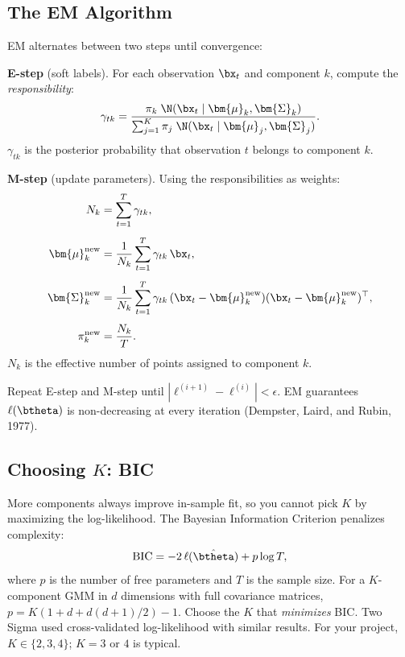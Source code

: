 \subsection{The EM Algorithm}
\label{sec:regimes:em}

EM alternates between two steps until convergence:

\begin{keyidea}
\textbf{E-step} (soft labels).  For each observation $\bx_t$ and component
$k$, compute the \emph{responsibility}:
\begin{equation}
  \gamma_{tk} = \frac{\pi_k \; \N(\bx_t \mid \bm{\mu}_k, \bm{\Sigma}_k)}
    {\sum_{j=1}^{K} \pi_j \; \N(\bx_t \mid \bm{\mu}_j, \bm{\Sigma}_j)}.
  \label{eq:estep}
\end{equation}
$\gamma_{tk}$ is the posterior probability that observation $t$ belongs to
component $k$.

\textbf{M-step} (update parameters).  Using the responsibilities as weights:
\begin{align}
  N_k &= \sum_{t=1}^{T} \gamma_{tk}, \label{eq:mstep-n}\\[4pt]
  \bm{\mu}_k^{\text{new}} &= \frac{1}{N_k} \sum_{t=1}^{T} \gamma_{tk}\,
    \bx_t, \label{eq:mstep-mu}\\[4pt]
  \bm{\Sigma}_k^{\text{new}} &= \frac{1}{N_k} \sum_{t=1}^{T}
    \gamma_{tk}\,(\bx_t - \bm{\mu}_k^{\text{new}})
    (\bx_t - \bm{\mu}_k^{\text{new}})^\top, \label{eq:mstep-sigma}\\[4pt]
  \pi_k^{\text{new}} &= \frac{N_k}{T}. \label{eq:mstep-pi}
\end{align}
$N_k$ is the effective number of points assigned to component $k$.

Repeat E-step and M-step until $|\ell^{(i+1)} - \ell^{(i)}| < \epsilon$.
EM guarantees $\ell(\btheta)$ is non-decreasing at every iteration
(Dempster, Laird, and Rubin, 1977).
\end{keyidea}

\subsection{Choosing $K$: BIC}
\label{sec:regimes:bic}

More components always improve in-sample fit, so you cannot pick $K$ by
maximizing the log-likelihood.  The Bayesian Information Criterion penalizes
complexity:
\begin{equation}
  \text{BIC} = -2\,\ell(\hat{\btheta}) + p \log T,
  \label{eq:bic}
\end{equation}
where $p$ is the number of free parameters and $T$ is the sample size.
For a $K$-component GMM in $d$ dimensions with full covariance matrices,
$p = K(1 + d + d(d+1)/2) - 1$.  Choose the $K$ that
\emph{minimizes} BIC.  Two Sigma used cross-validated log-likelihood with
similar results.  For your project, $K \in \{2, 3, 4\}$; $K = 3$ or $4$
is typical.

